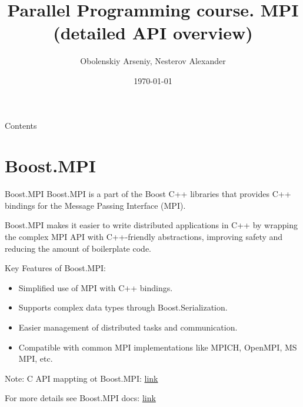 \documentclass{beamer}
\title[Parallel Programming. MPI (detailed API overview)]{Parallel Programming course. MPI (detailed API overview)}
\author{Obolenskiy Arseniy, Nesterov Alexander}
\institute{Nizhny Novgorod State University}
\date{\today} %
\begin{document}
\begin{frame}
    \titlepage
\end{frame}

\begin{frame}{Contents}
    \tableofcontents
\end{frame}

\section{Boost.MPI}

\begin{frame}{Boost.MPI}
  Boost.MPI is a part of the Boost C++ libraries that provides C++ bindings for the Message Passing Interface (MPI).

  Boost.MPI makes it easier to write distributed applications in C++ by wrapping the complex MPI API with C++-friendly abstractions, improving safety and reducing the amount of boilerplate code.

  Key Features of Boost.MPI:
  \begin{itemize}
    \item Simplified use of MPI with C++ bindings.
    \item Supports complex data types through Boost.Serialization.
    \item Easier management of distributed tasks and communication.
    \item Compatible with common MPI implementations like MPICH, OpenMPI, MS MPI, etc.
  \end{itemize}

  Note: C API mappting ot Boost.MPI: \href{https://www.boost.org/doc/libs/1_86_0/doc/html/mpi/c_mapping.html}{link}

  {\footnotesize For more details see Boost.MPI docs: \href{https://www.boost.org/doc/libs/1_86_0/doc/html/mpi.html}{link}}
\end{frame}
\end{document}
